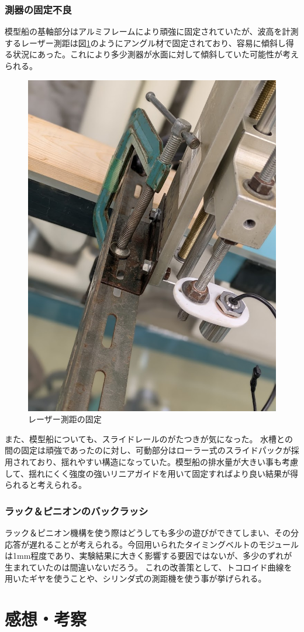 \documentclass[dvipdfmx,a4paper]{jreport} %
\begin{document}
\subsection{測器の固定不良}
模型船の基軸部分はアルミフレームにより頑強に固定されていたが、波高を計測するレーザー測距は図\ref{fig:angle}のようにアングル材で固定されており、容易に傾斜し得る状況にあった。これにより多少測器が水面に対して傾斜していた可能性が考えられる。
\begin{figure}[H]
    \centering
    \includegraphics[width=0.5\linewidth]{summer/ship-experiment/2d-pool/pictures/angle.png}
    \caption{レーザー測距の固定}
    \label{fig:angle}
\end{figure}

また、模型船についても、スライドレールのがたつきが気になった。
水槽との間の固定は頑強であったのに対し、可動部分はローラー式のスライドパックが採用されており、揺れやすい構造になっていた。模型船の排水量が大きい事も考慮して、揺れにくく強度の強いリニアガイドを用いて固定すればより良い結果が得られると考えられる。

\subsection{ラック＆ピニオンのバックラッシ}
ラック＆ピニオン機構を使う際はどうしても多少の遊びができてしまい、その分応答が遅れることが考えられる。今回用いられたタイミングベルトのモジュールは1mm程度であり、実験結果に大きく影響する要因ではないが、多少のずれが生まれていたのは間違いないだろう。
これの改善策として、トコロイド曲線を用いたギヤを使うことや、シリンダ式の測距機を使う事が挙げられる。

\chapter{感想・考察}
\end{document}
